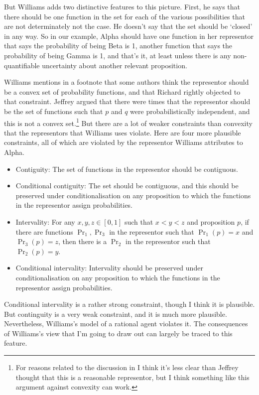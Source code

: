 But Williams adds two distinctive features to this picture. First, he says that there should be one function in the set for each of the various possibilities that are not determinately not the case. He doesn't say that the set should be `closed' in any way. So in our example, Alpha should have one function in her representor that says the probability of being Beta is 1, another function that says the probability of being Gamma is 1, and that's it, at least unless there is any non-quantifiable uncertainty about another relevant proposition.

Williams mentions in a footnote that some authors think the representor should be a convex set of probability functions, and that Richard \citet{Jeffrey1983} rightly objected to that constraint. Jeffrey argued that there were times that the representor should be the set of functions such that $p$ and $q$ were probabilistically independent, and this is not a convex set.\footnote{For reasons related to the discussion in \citet{MossScoringRules} I think it's less clear than Jeffrey thought that this is a reasonable representor, but I think something like this argument against convexity can work.} But there are a lot of weaker constraints than convexity that the representors that Williams uses violate. Here are four more plausible constraints, all of which are violated by the representor Williams attributes to Alpha.

\begin{itemize}
\item Contiguity: The set of functions in the representor should be contiguous.
\item Conditional contiguity: The set should be contiguous, and this should be preserved under conditionalisation on any proposition to which the functions in the representor assign probabilities.
\item Intervality: For any $x, y, z \in [0, 1]$ such that $x < y < z$ and proposition $p$, if there are functions $\Pr_1, \Pr_3$ in the representor such that $\Pr_1(p) = x$ and $\Pr_3(p) = z$, then there is a $\Pr_2$ in the representor such that $\Pr_2(p) = y$.
\item Conditional intervality: Intervality should be preserved under conditionalisation on any proposition to which the functions in the representor assign probabilities.
\end{itemize}

\noindent Conditional intervality is a rather strong constraint, though I think it is plausible. But continguity is a very weak constraint, and it is much more plausible. Nevertheless, Williams's model of a rational agent violates it. The consequences of Williams's view that I'm going to draw out can largely be traced to this feature.

